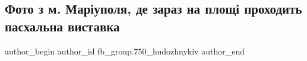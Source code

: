  
 
 
 
 

\subsection{Фото з м. Маріуполя, де зараз на площі проходить пасхальна виставка}
\label{sec:28_04_2019.fb.fb_group.750_hudozhnykiv.1.foto_z_mariupolja_pysanky}

\ifcmt
 author_begin
   author_id fb_group.750_hudozhnykiv
 author_end
\fi
